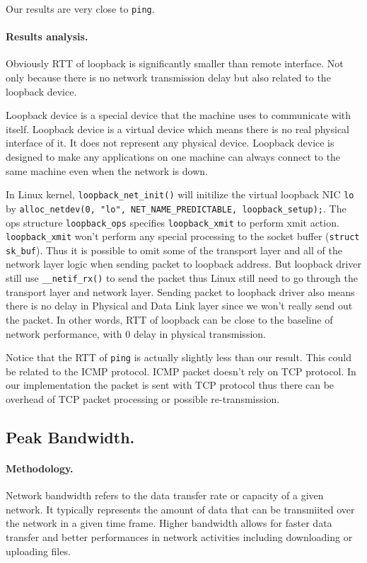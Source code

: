 Our results are very close to \texttt{ping}.

\paragraph{Results analysis.} Obviously RTT of loopback is significantly smaller than remote interface. Not only because there is no network transmission delay but also related to the loopback device. 

Loopback device is a special device that the machine uses to communicate with itself. Loopback device is a virtual device which means there is no real physical interface of it. It does not represent any physical device. Loopback device is designed to make any applications on one machine can always connect to the same machine even when the network is down.

In Linux kernel, \texttt{loopback\_net\_init()} will initilize the virtual loopback NIC \texttt{lo} by \texttt{alloc\_netdev(0, "lo", NET\_NAME\_PREDICTABLE, loopback\_setup);}. The ops structure \texttt{loopback\_ops} specifies \texttt{loopback\_xmit} to perform xmit action. \texttt{loopback\_xmit} won't perform any special processing to the socket buffer (\texttt{struct sk\_buf}). Thus it is possible to omit some of the transport layer and all of the network layer logic when sending packet to loopback address. But loopback driver still use \texttt{\_\_netif\_rx()} to send the packet thus Linux still need to go  through the transport layer and network layer. Sending packet to loopback driver also means there is no delay in Physical and Data Link layer since we won't really send out the packet. In other words, RTT of loopback can be close to the baseline of network performance, with 0 delay in physical transmission.

Notice that the RTT of \texttt{ping} is actually slightly less than our result. This could be related to the ICMP protocol. ICMP packet doesn't rely on TCP protocol. In our implementation the packet is sent with TCP protocol thus there can be overhead of TCP packet processing or possible re-transmission.

\subsection{Peak Bandwidth.} 
\paragraph{Methodology.} Network bandwidth refers to the data transfer rate or capacity of a given network. It typically represents the amount of data that can be transmiited over the network in a given time frame. Higher bandwidth allows for faster data transfer and better performances in network activities including downloading or uploading files. 

